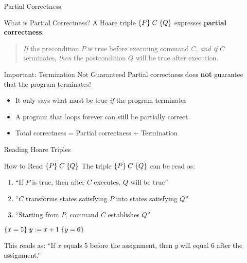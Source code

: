 \begin{frame}{Partial Correctness}
    \begin{block}{What is Partial Correctness?}
        A Hoare triple $\{P\}\; C\; \{Q\}$ expresses \textbf{partial correctness}:
        \begin{quote}
            \emph{If} the precondition $P$ is true before executing command $C$, \emph{and if} $C$ terminates, \emph{then} the postcondition $Q$ will be true after execution.
        \end{quote}
    \end{block}
    
    \begin{alertblock}{Important: Termination Not Guaranteed}
        Partial correctness does \textbf{not} guarantee that the program terminates!
        \begin{itemize}
            \item It only says what must be true \emph{if} the program terminates
            \item A program that loops forever can still be partially correct
            \item Total correctness = Partial correctness + Termination
        \end{itemize}
    \end{alertblock}
\end{frame}

\begin{frame}{Reading Hoare Triples}
    \begin{block}{How to Read $\{P\}\; C\; \{Q\}$}
        The triple $\{P\}\; C\; \{Q\}$ can be read as:
        \begin{enumerate}
            \item ``If $P$ is true, then after $C$ executes, $Q$ will be true''
            \item ``$C$ transforms states satisfying $P$ into states satisfying $Q$''
            \item ``Starting from $P$, command $C$ establishes $Q$''
        \end{enumerate}
    \end{block}
    
    \begin{example}
        $\{x = 5\}\; y := x + 1\; \{y = 6\}$
        
        This reads as: ``If $x$ equals 5 before the assignment, then $y$ will equal 6 after the assignment.''
    \end{example}
\end{frame}

